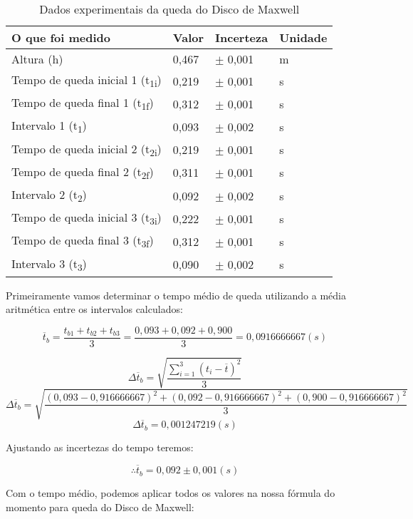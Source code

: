 \begin{table}[H]
    \centering
    \begin{tabular}{ |M{6cm}||M{2cm}||M{2cm}||M{2cm}|  }
        \hline
        \textbf{O que foi medido} & \textbf{Valor} & \textbf{Incerteza} & \textbf{Unidade}\\
        \hline
        Altura (h)                                      & 0,467 & $\pm$ 0,001 & m\\
        Tempo de queda inicial 1 (t\textsubscript{1i})  & 0,219 & $\pm$ 0,001 & s\\
        Tempo de queda final 1 (t\textsubscript{1f})    & 0,312 & $\pm$ 0,001 & s\\
        Intervalo 1 (t\textsubscript{1})                & 0,093 & $\pm$ 0,002 & s\\
        Tempo de queda inicial 2 (t\textsubscript{2i})  & 0,219 & $\pm$ 0,001 & s\\
        Tempo de queda final 2 (t\textsubscript{2f})    & 0,311 & $\pm$ 0,001 & s\\
        Intervalo 2 (t\textsubscript{2})                & 0,092 & $\pm$ 0,002 & s\\
        Tempo de queda inicial 3 (t\textsubscript{3i})  & 0,222 & $\pm$ 0,001 & s\\
        Tempo de queda final 3 (t\textsubscript{3f})    & 0,312 & $\pm$ 0,001 & s\\
        Intervalo 3 (t\textsubscript{3})                & 0,090 & $\pm$ 0,002 & s\\
        \hline
    \end{tabular}
    \caption{Dados experimentais da queda do Disco de Maxwell}
\end{table}

Primeiramente vamos determinar o tempo médio de queda utilizando a média aritmética entre os intervalos calculados:

\[\overline{t}_b = \frac{t_{b1} + t_{b2} + t_{b3}}{3} = \frac{0,093 + 0,092 + 0,900}{3} = 0,0916666667 (s)\]

\[\Delta \overline{t}_b = \sqrt{\frac{\sum_{i=1}^{3} (t_i - \overline{t})^2}{3}}\]
\[\Delta \overline{t}_b = \sqrt{\frac{(0,093-0,916666667)^2 + (0,092-0,916666667)^2 + (0,900-0,916666667)^2}{3}}\]
\[\Delta \overline{t}_b = 0,001247219 (s)\]

Ajustando as incertezas do tempo teremos:

\[\therefore \overline{t}_b = 0,092 \pm 0,001 (s)\]

Com o tempo médio, podemos aplicar todos os valores na nossa fórmula do momento para queda do Disco de Maxwell:

